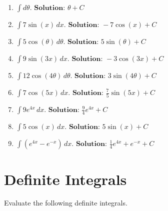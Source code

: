 \documentclass{article}
\begin{document}
\begin{enumerate}[leftmargin=0.5cm, label=(\alph*), rightmargin=0.2cm]
    \item $\int d\theta$.\quad
    \(
    \textbf{Solution: } \theta + C
    \)

    \item $\int 7\sin(x) \, dx$.\quad
    \(
    \textbf{Solution: } -7\cos(x) + C
    \)

    \item $\int 5\cos(\theta) \, d\theta$.\quad
    \(
    \textbf{Solution: } 5\sin(\theta) + C
    \)

    \item $\int 9\sin(3x) \, dx$.\quad
    \(
    \textbf{Solution: } -3\cos(3x) + C
    \)

    \item $\int 12\cos(4\theta) \, d\theta$.\quad
    \(
    \textbf{Solution: } 3\sin(4\theta) + C
    \)

    \item $\int 7\cos(5x) \, dx$.\quad
    \(
    \textbf{Solution: } \frac{7}{5}\sin(5x) + C
    \)

    \item $\int 9e^{4x} \, dx$.\quad
    \(
    \textbf{Solution: } \frac{9}{4}e^{4x} + C
    \)

    \item $\int 5\cos(x) \, dx$.\quad
    \(
    \textbf{Solution: } 5\sin(x) + C
    \)

    \item $\int (e^{4x} - e^{-x}) \, dx$.\quad
    \(
    \textbf{Solution: } \frac{1}{4}e^{4x} + e^{-x} + C
    \)
\end{enumerate}

\section*{Definite Integrals}

Evaluate the following definite integrals.
\end{document}
